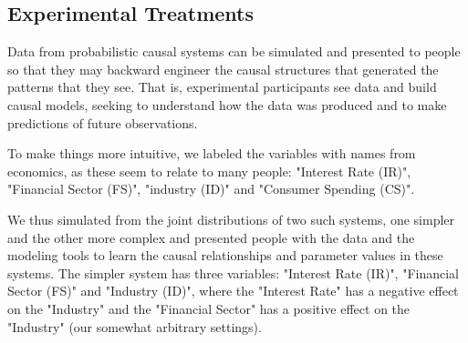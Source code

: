 


\subsection{Experimental Treatments}

Data from probabilistic causal systems can be simulated and presented to people so that they may backward engineer the causal structures that generated the patterns that they see. That is, experimental participants see data and build causal models, seeking to understand how the data was produced and to make predictions of future observations. 

To make things more intuitive, we labeled the variables with names from economics, as these seem to relate to many people: "Interest Rate (IR)", "Financial Sector (FS)", "industry (ID)" and "Consumer Spending (CS)". 


We thus simulated from the joint distributions of two such systems, one simpler and the other more complex and presented people with the data and the modeling tools to learn the causal relationships and parameter values in these systems. The simpler system has three variables: "Interest Rate (IR)", "Financial Sector (FS)" and "Industry (ID)", where the "Interest Rate" has a negative effect on the "Industry" and the "Financial Sector" has a positive effect on the "Industry" (our somewhat arbitrary settings).

